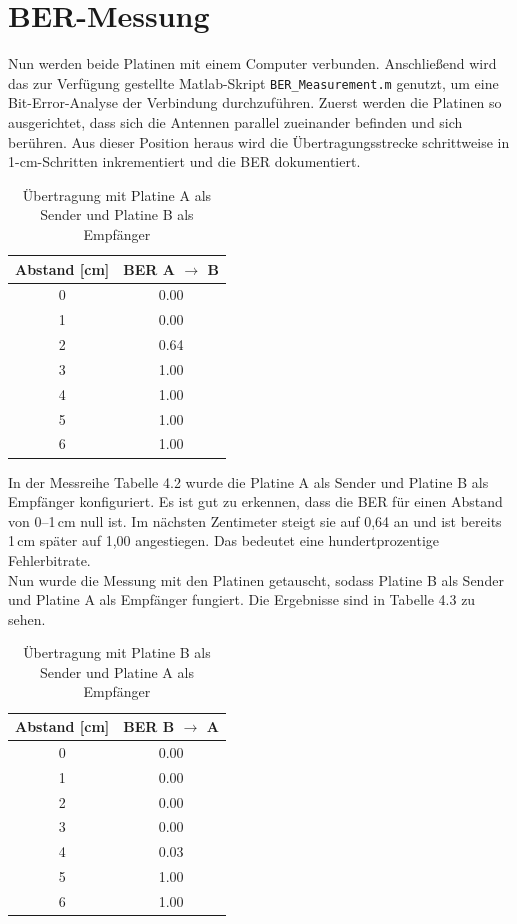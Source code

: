 \section{BER-Messung}
Nun werden beide Platinen mit einem Computer verbunden. Anschließend wird das zur Verfügung gestellte
Matlab-Skript \texttt{BER\_Measurement.m} genutzt, um eine Bit-Error-Analyse der Verbindung durchzuführen.
Zuerst werden die Platinen so ausgerichtet, dass sich die Antennen parallel zueinander befinden und sich berühren.
Aus dieser Position heraus wird die Übertragungsstrecke schrittweise in 1-cm-Schritten inkrementiert und die BER dokumentiert.

\begin{table}[h!]
    \centering
        \begin{tabular}{c|c}
            Abstand [cm] & BER A $\rightarrow$ B \\
            \hline
             0 & 0.00 \\
            \hline
             1 & 0.00 \\
            \hline
             2 & 0.64 \\
            \hline
             3 &  1.00 \\
            \hline
             4 &   1.00 \\
            \hline
             5 & 1.00 \\
            \hline
             6 & 1.00 \\
        \end{tabular}
        \caption{Übertragung mit Platine A als Sender und Platine B als Empfänger}
    \end{table}
In der Messreihe Tabelle 4.2 wurde die Platine A als Sender und Platine B als Empfänger konfiguriert.
Es ist gut zu erkennen, dass die BER für einen Abstand von 0–1\,cm null ist. Im nächsten Zentimeter
steigt sie auf 0,64 an und ist bereits 1\,cm später auf 1,00 angestiegen. Das bedeutet eine
hundertprozentige Fehlerbitrate.\\

Nun wurde die Messung mit den Platinen getauscht, sodass Platine B als Sender und Platine A als Empfänger fungiert. Die Ergebnisse
sind in Tabelle 4.3 zu sehen.
\begin{table}[h!]
    \centering
        \begin{tabular}{c|c}
            Abstand [cm] & BER B $\rightarrow$ A \\
            \hline
             0 & 0.00 \\
            \hline
             1 & 0.00 \\
            \hline
             2 & 0.00 \\
            \hline
             3 & 0.00 \\
            \hline
             4 & 0.03 \\
            \hline
             5 & 1.00 \\
            \hline
             6 & 1.00 \\
        \end{tabular}
        \caption{Übertragung mit Platine B als Sender und Platine A als Empfänger}
    \end{table}
    \\
    
